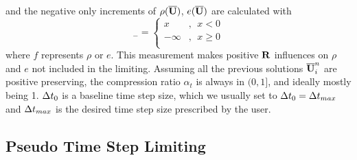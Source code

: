 and the negative only increments of $\rho(\overline{\mathbf{U}})$, $e(\overline{\mathbf{U}})$
are calculated with
\begin{equation}
    [x]_-=
    \left\{
    \begin{array}{ll}
        x  & ,\ \   x < 0    \\
        -\infty & ,\ \   x \geq 0 \\
    \end{array}
    \right.
\end{equation}
where $f$ represents $\rho$ or $e$.
This measurement makes positive $\mathbf{R}$ influences
on $\rho$ and $e$ not included in the limiting.
Assuming all the previous solutions $\overline{\mathbf{U}}^n_i$ 
are positive preserving,
the compression ratio $\alpha_t$ is always in 
$(0,1]$, and ideally mostly being 1.  
$\mathrm\Delta t_0$ is a baseline time step size, which 
we usually set to $\mathrm\Delta t_0 = \mathrm\Delta t_{max}$
and $\mathrm\Delta t_{max}$ is the desired time step size
prescribed by the user.

\subsection{Pseudo Time Step Limiting}

